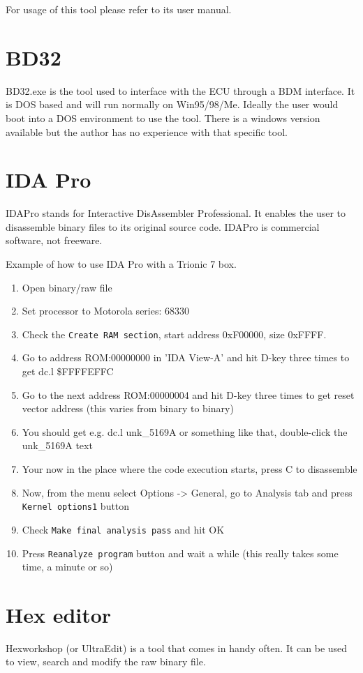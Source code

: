 \documentclass[11pt,a4paper]{book}
\begin{document}
For usage of this tool please refer to its user manual.

\section{BD32}
BD32.exe is the tool used to interface with the ECU through a BDM interface. It
is DOS based and will run normally on Win95/98/Me. Ideally the user would boot
into a DOS environment to use the tool. There is a windows version available but
the author has no experience with that specific tool.

\section{IDA Pro}
IDAPro stands for Interactive DisAssembler Professional. It enables the user to
disassemble binary files to its original source code. IDAPro is commercial
software, not freeware.

Example of how to use IDA Pro with a Trionic 7 box.
\begin{enumerate}
    \item Open binary/raw file
    \item Set processor to Motorola series: 68330
    \item Check the \texttt{Create RAM section}, start address 0xF00000, size 0xFFFF.
    \item Go to address ROM:00000000 in 'IDA View-A' and hit D-key three times
        to get dc.l \$FFFFEFFC
    \item Go to the next address ROM:00000004 and hit D-key three times to get reset vector address (this
        varies from binary to binary)
    \item You should get e.g. dc.l unk\_5169A or something like that, double-click
        the unk\_5169A text
    \item Your now in the place where the code execution starts, press C to disassemble
    \item Now, from the menu select Options -> General, go to Analysis tab and press
        \texttt{Kernel options1} button
    \item Check \texttt{Make final analysis pass} and hit OK
    \item Press \texttt{Reanalyze program} button and wait a while (this really takes some time, a minute or so)
\end{enumerate}

\section{Hex editor}
Hexworkshop (or UltraEdit) is a tool that comes in handy often. It can be used to view, search and
modify the raw binary file.
\end{document}
